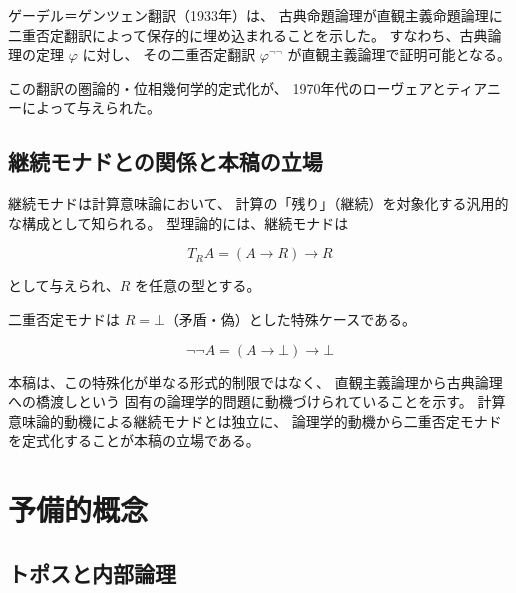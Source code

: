 \documentclass[11pt,a4paper]{article}
\theoremstyle{definition}
\begin{document}
ゲーデル＝ゲンツェン翻訳（1933年）は、
古典命題論理が直観主義命題論理に
二重否定翻訳によって保存的に埋め込まれることを示した。
すなわち、古典論理の定理 $\varphi$ に対し、
その二重否定翻訳 $\varphi^{\neg\neg}$ が直観主義論理で証明可能となる。

この翻訳の圏論的・位相幾何学的定式化が、
1970年代のローヴェアとティアニーによって与えられた。

\subsection{継続モナドとの関係と本稿の立場}

継続モナドは計算意味論において、
計算の「残り」（継続）を対象化する汎用的な構成として知られる。
型理論的には、継続モナドは

\begin{equation}
T_R A = (A \to R) \to R
\end{equation}

として与えられ、$R$ を任意の型とする。

二重否定モナドは $R = \bot$（矛盾・偽）とした特殊ケースである。

\begin{equation}
\neg\neg A = (A \to \bot) \to \bot
\end{equation}

本稿は、この特殊化が単なる形式的制限ではなく、
直観主義論理から古典論理への橋渡しという
固有の論理学的問題に動機づけられていることを示す。
計算意味論的動機による継続モナドとは独立に、
論理学的動機から二重否定モナドを定式化することが本稿の立場である。

\section{予備的概念}

\subsection{トポスと内部論理}
\end{document}

